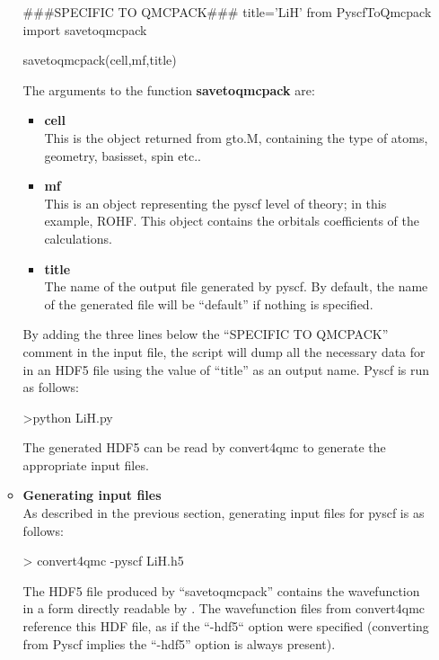 \begin{itemize}
\begin{itemize}
\begin{shade}
###SPECIFIC TO QMCPACK###
title='LiH'
from PyscfToQmcpack import savetoqmcpack

savetoqmcpack(cell,mf,title)
 
\end{shade}

The arguments to the function \textbf{savetoqmcpack} are:\\
\begin{itemize}
 \item \textbf{cell}\\
 This is the object returned from gto.M, containing the type of atoms, geometry, basisset, spin etc.. \\
 \item \textbf{mf}\\
This is an object representing the pyscf level of theory; in this example, ROHF. This object contains the orbitals coefficients of the calculations. \\
 \item \textbf{title}\\
 The name of the output file generated by pyscf. By default, the name of the generated file will be ``default'' if nothing is specified.\\
 \end{itemize}

By adding the three lines below the ``SPECIFIC TO QMCPACK'' comment  in the input file, the script will dump all the necessary data for \qmcpack in an HDF5 file using the value of ``title'' as an output name. Pyscf is run as follows:\\
\begin{shade}
 >python LiH.py
\end{shade}


The generated HDF5 can be read by convert4qmc to generate the appropriate \qmcpack input files.\\

 \item \textbf{Generating input files}\\
 
 As described in the previous section, generating input files for pyscf is as follows:\\
 \begin{shade}
  > convert4qmc -pyscf LiH.h5 
 \end{shade}

The HDF5 file produced by ``savetoqmcpack'' contains the wavefunction in a form directly readable by \qmcpack.
The wavefunction files from convert4qmc reference this HDF file, as if the ``-hdf5`` option were specified
(converting from Pyscf implies the ``-hdf5'' option is always present).


\end{itemize}
\end{itemize}
